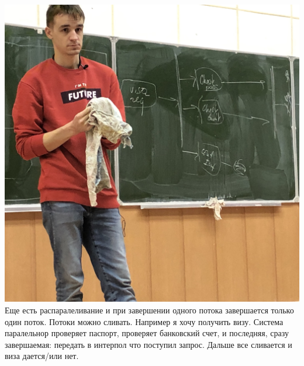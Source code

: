 \documentclass[12pt; a4paper]{book}
\begin{document}
\includegraphics[angle=0, width=\textwidth]{IMG/IMG_0826.jpg} \\
Еще есть распаралеливание и при завершении одного потока завершается только один поток. Потоки можно сливать. 
Например я хочу получить визу. Система паралельнор проверяет паспорт, проверяет банковский счет, и последняя, сразу завершаемая: передать в интерпол что поступил запрос. Дальше все сливается и виза дается/или нет.
\end{document}
